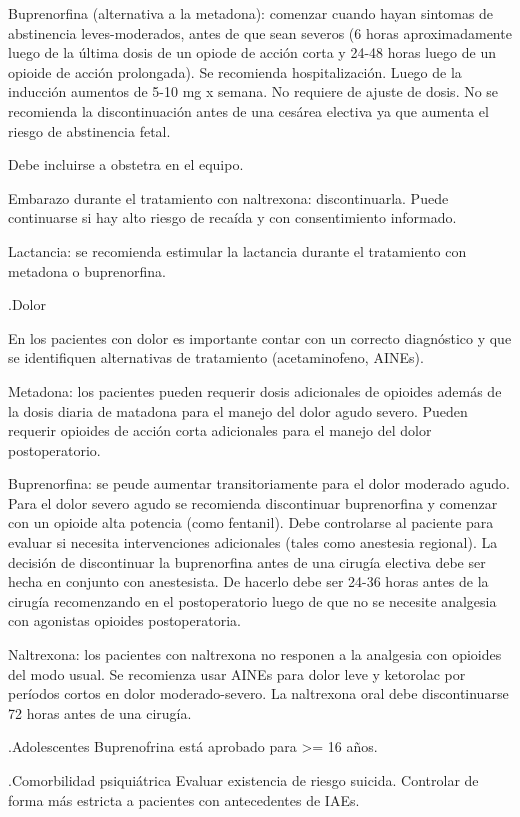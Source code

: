 \documentclass{scrbook}
\begin{document}
Buprenorfina (alternativa a la metadona): comenzar cuando hayan sintomas de abstinencia leves-moderados, antes de que sean severos (6 horas aproximadamente luego de la última dosis de un opiode de acción corta y 24-48 horas luego de un opioide de acción prolongada). Se recomienda hospitalización. Luego de la inducción aumentos de 5-10 mg x semana. No requiere de ajuste de dosis. No se recomienda la discontinuación antes de una cesárea electiva ya que aumenta el riesgo de abstinencia fetal.

Debe incluirse a obstetra en el equipo.

Embarazo durante el tratamiento con naltrexona: discontinuarla. Puede continuarse si hay alto riesgo de recaída y con consentimiento informado.

Lactancia: se recomienda estimular la lactancia durante el tratamiento con metadona o buprenorfina.

.Dolor

En los pacientes con dolor es importante contar con un correcto diagnóstico y que se identifiquen alternativas de tratamiento (acetaminofeno, AINEs).

Metadona: los pacientes pueden requerir dosis adicionales de opioides además de la dosis diaria de matadona para el manejo del dolor agudo severo. Pueden requerir opioides de acción corta adicionales para el manejo del dolor postoperatorio.

Buprenorfina: se peude aumentar transitoriamente para el dolor moderado agudo. Para el dolor severo agudo se recomienda discontinuar buprenorfina y comenzar con un opioide alta potencia (como fentanil). Debe controlarse al paciente para evaluar si necesita intervenciones adicionales (tales como anestesia regional).
La decisión de discontinuar la buprenorfina antes de una cirugía electiva debe ser hecha en conjunto con anestesista. De hacerlo debe ser 24-36 horas antes de la cirugía recomenzando en el postoperatorio luego de que no se necesite analgesia con agonistas opioides postoperatoria.

Naltrexona: los pacientes con naltrexona no responen a la analgesia con opioides del modo usual. Se recomienza usar AINEs para dolor leve y ketorolac por períodos cortos en dolor moderado-severo.
La naltrexona oral debe discontinuarse 72 horas antes de una cirugía.

.Adolescentes
Buprenofrina está aprobado para >= 16 años.

.Comorbilidad psiquiátrica
Evaluar existencia de riesgo suicida.
Controlar de forma más estricta a pacientes con antecedentes de IAEs.
\end{document}
